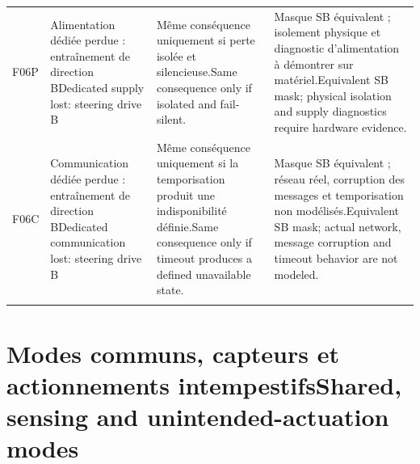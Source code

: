 \documentclass[11pt,a4paper,oneside]{report}
\newcommand{\bi}[2]{\iffrench #2\else #1\fi}
\renewcommand{\sec}[2]{\section{\bi{#1}{#2}}}
\begin{document}
\begin{longtable}{@{}p{12mm}>{\raggedright\arraybackslash}p{33mm}>{\raggedright\arraybackslash}p{42mm}>{\raggedright\arraybackslash}p{57mm}@{}}
F06P & \bi{Dedicated supply lost: steering drive B}{Alimentation dédiée perdue : entraînement de direction B} & \bi{Same consequence only if isolated and fail-silent.}{Même conséquence uniquement si perte isolée et silencieuse.} & \bi{Equivalent SB mask; physical isolation and supply diagnostics require hardware evidence.}{Masque SB équivalent ; isolement physique et diagnostic d'alimentation à démontrer sur matériel.}\\\addlinespace
F06C & \bi{Dedicated communication lost: steering drive B}{Communication dédiée perdue : entraînement de direction B} & \bi{Same consequence only if timeout produces a defined unavailable state.}{Même conséquence uniquement si la temporisation produit une indisponibilité définie.} & \bi{Equivalent SB mask; actual network, message corruption and timeout behavior are not modeled.}{Masque SB équivalent ; réseau réel, corruption des messages et temporisation non modélisés.}\\\addlinespace
\bottomrule\end{longtable}\endgroup
\sec{Shared, sensing and unintended-actuation modes}{Modes communs, capteurs et actionnements intempestifs}
\begingroup\small{}
\end{document}
